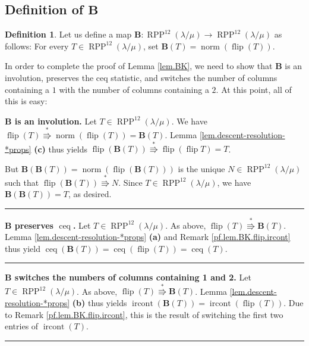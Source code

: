 \documentclass[12pt]{article}
\theoremstyle{plain}
\theoremstyle{definition}
\newtheorem{definition}[theorem]{Definition}
\newenvironment{proof}[1][Proof]{\noindent\textbf{#1.} }{\ \rule{0.5em}{0.5em}}
\def\ceq{{\operatorname{ceq}}}
\def\ircont{{\operatorname{ircont}}}
\def\OneTwoRPP{{\operatorname{RPP}^{12}\left(  \lambda/\mu\right)}}
\begin{document}
\subsection{Definition of $\mathbf{B}$}

\begin{definition}
\label{defi.B}
Let us define a map $\mathbf{B}:\OneTwoRPP\rightarrow\OneTwoRPP$ as follows:
For every $T\in\OneTwoRPP$, set $\mathbf{B}\left(
T\right) = \operatorname*{norm}\left(  \operatorname*{flip}\left(
T\right)  \right)  $.
\end{definition}

In order to complete the proof of Lemma
\ref{lem.BK}, we need to show that $\mathbf{B}$ is an involution, preserves the ceq statistic, and switches the number of columns containing a $1$ with the number of columns containing a $2$. At this point, all of this is easy:

\begin{proof}[$\mathbf{B}$ is an involution]
Let $T\in \OneTwoRPP$. We have $\operatorname*{flip}\left(
T\right)  \overset{\ast}{\Rrightarrow}\operatorname*{norm}\left(
\operatorname*{flip}\left(  T\right)  \right)  =
\mathbf{B}\left(  T\right)  $. Lemma \ref{lem.descent-resolution-*props} \textbf{(c)} thus yields $\operatorname*{flip}\left(  \mathbf{B}\left(  T\right)
\right)  \overset{\ast}{\Rrightarrow}\operatorname*{flip}\left(
\operatorname*{flip}T\right)  = T$.

But $\mathbf{B}(\mathbf{B}(T)) = \operatorname*{norm}\left(  \operatorname*{flip}\left(
\mathbf{B}\left(  T\right)  \right)  \right)  $ is the unique $N\in\OneTwoRPP$
such that \newline $\operatorname*{flip}\left(  \mathbf{B}\left(  T\right)  \right)
\overset{\ast}{\Rrightarrow}N$. Since $T \in \OneTwoRPP$, we have $\mathbf{B}(\mathbf{B}(T)) = T$, as desired.
\end{proof}

\begin{proof}[$\mathbf{B}$ preserves $\ceq$]
Let $T\in\OneTwoRPP$. As above, $\operatorname*{flip}\left(  T\right)  \overset{\ast
}{\Rrightarrow}\mathbf{B}\left(  T\right)  $. Lemma \ref{lem.descent-resolution-*props} \textbf{(a)} and Remark \ref{pf.lem.BK.flip.ircont} thus yield
$\operatorname*{ceq}\left(  \mathbf{B}\left(  T\right)  \right)
=\operatorname*{ceq}\left(  \operatorname*{flip}\left(  T\right)  \right)
=\operatorname*{ceq}\left(  T\right)$.
\end{proof}

\begin{proof}[$\mathbf{B}$ switches the numbers of columns containing 1 and 2]
Let $T\in\OneTwoRPP$. As above, $\operatorname*{flip}\left(  T\right)  \overset{\ast
}{\Rrightarrow}\mathbf{B}\left(  T\right)  $. Lemma \ref{lem.descent-resolution-*props} \textbf{(b)}
thus yields
$\operatorname*{ircont}\left(  \mathbf{B}\left(  T\right)  \right)
=\operatorname*{ircont}\left(  \operatorname*{flip}\left(  T\right)  \right)$.
Due to Remark \ref{pf.lem.BK.flip.ircont}, this is the result
of switching the first two entries of $\ircont\left(T\right)$.
\end{proof}
\end{document}
